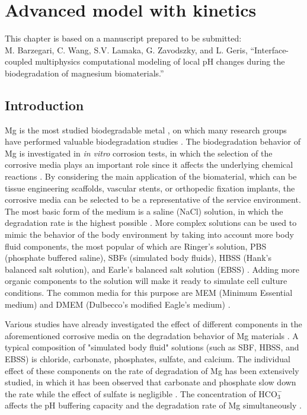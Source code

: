 \chapter{Advanced model with kinetics}\label{ch:kinetics}


\begin{shaded}
This chapter is based on a manuscript prepared to be submitted:\\
M. Barzegari, C. Wang, S.V. Lamaka, G. Zavodszky, and L. Geris, ``Interface-coupled multiphysics computational modeling of local pH changes during the biodegradation of magnesium biomaterials.''
\end{shaded}

\section{Introduction}

Mg is the most studied biodegradable metal \cite{Liu2019,Zheng2014,Chen2014,Zhang2013}, on which many research groups have performed valuable biodegradation studies \cite{Esmaily2017,Li2016,Atrens2020,Kirkland2012}. The biodegradation behavior of Mg is investigated in \textit{in vitro} corrosion tests, in which the selection of the corrosive media plays an important role since it affects the underlying chemical reactions \cite{Mei2020}. By considering the main application of the biomaterial, which can be tissue engineering scaffolds, vascular stents, or orthopedic fixation implants, the corrosive media can be selected to be a representative of the service environment. The most basic form of the medium is a saline (NaCl) solution, in which the degradation rate is the highest possible \cite{Mei2020}. More complex solutions can be used to mimic the behavior of the body environment by taking into account more body fluid components, the most popular of which are Ringer's solution, \gls{PBS} (phosphate buffered saline), \gls{SBF}s (simulated body fluids), \gls{HBSS} (Hank's balanced salt solution), and Earle's balanced salt solution (\gls{EBSS}) \cite{Mei2020}. Adding more organic components to the solution will make it ready to simulate cell culture conditions. The common media for this purpose are \gls{MEM} (Minimum Essential medium) and \gls{DMEM} (Dulbecco's modified Eagle's medium) \cite{Mei2020}.

Various studies have already investigated the effect of different components in the aforementioned corrosive media on the degradation behavior of Mg materials \cite{Mei2019,Zeng2014,Johnston2017, Lamaka2018,Mei2019a}. A typical composition of "simulated body fluid" solutions (such as \gls{SBF}, \gls{HBSS}, and \gls{EBSS}) is chloride, carbonate, phosphates, sulfate, and calcium. The individual effect of these components on the rate of degradation of Mg has been extensively studied, in which it has been observed that carbonate and phosphate slow down the rate while the effect of sulfate is negligible \cite{Johnston2017,Mei2019a}. The concentration of $\mathrm{HCO}_{3}^{-}$ affects the pH buffering capacity and the degradation rate of Mg simultaneously \cite{Xin2011}.

